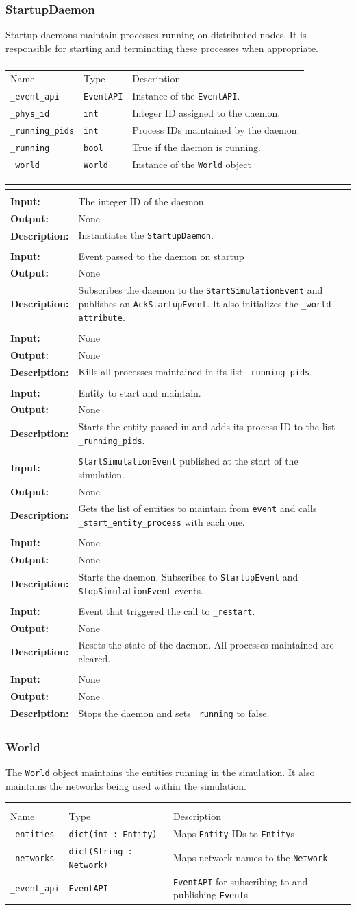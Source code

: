 \documentclass[titlepage]{article}
\newcommand{\operations}[1]{
\begin{center}
    \begin{longtable}{|p{4cm}|p{10cm + 2.0\tabcolsep}|}
    \hline
    \multicolumn{2}{|l|}{\cellcolor[gray]{0.5}{\textbf{Operations}}} \\ \hline
#1
    \end{longtable}
\end{center}
}
\newcommand{\operation}[4]{
    \hline
    \multicolumn{2}{|l|}{\cellcolor[gray]{0.8}{\texttt{#1}}} \\ \hline
    \hspace{7pt}\textbf{Input:} & #2 \\ \hline
    \hspace{7pt}\textbf{Output:} & #3 \\ \hline
    \hspace{7pt}\textbf{Description:} & #4 \\ \hline
}
\newcommand{\attributes}[1]{
    \begin{center}
        \begin{tabular}{|p{3.5cm}|p{3.5cm}|p{7cm}|}
            \multicolumn{3}{|l|}{\cellcolor[gray]{0.5}{\textbf{Attributes}}} \\ \hline
            \rowcolor[gray]{0.8} Name & Type & Description \\ \hline 
            #1
        \end{tabular}
    \end{center}
}
\newcommand{\attribute}[3]{
    \texttt{#1} & \texttt{#2} & #3 \\ \hline
}
\begin{document}
\subsubsection{StartupDaemon}
{Startup daemons maintain processes running on distributed nodes. It is responsible for starting and terminating these processes when appropriate.}

\attributes{
    \attribute{\_event\_api}{EventAPI}{Instance of the \texttt{EventAPI}.}
    \attribute{\_phys\_id}{int}{Integer ID assigned to the daemon.}
    \attribute{\_running\_pids}{int}{Process IDs maintained by the daemon.}
    \attribute{\_running}{bool}{True if the daemon is running.}
    \attribute{\_world}{World}{Instance of the \texttt{World} object}
}

\operations{
    \operation{\_\_init\_\_(phys\_id)}{The integer ID of the daemon.}{None}{Instantiates the \texttt{StartupDaemon}.}
    \operation{\_on\_startup(event)}{Event passed to the daemon on startup}{None}{Subscribes the daemon to the \texttt{StartSimulationEvent} and publishes an \texttt{AckStartupEvent}. It also initializes the \texttt{\_world attribute}.}
    \operation{terminate\_all()}{None}{None}{Kills all processes maintained in its list \texttt{\_running\_pids}.}
    \operation{\_start\_entity\_processes(entity)}{Entity to start and maintain.}{None}{Starts the entity passed in and adds its process ID to the list \texttt{\_running\_pids}.}
    \operation{\_on\_sim\_start(event)}{\texttt{StartSimulationEvent} published at the start of the simulation.}{None}{Gets the list of entities to maintain from \texttt{event} and calls \texttt{\_start\_entity\_process} with each one.}
    \operation{start()}{None}{None}{Starts the daemon. Subscribes to \texttt{StartupEvent} and \texttt{StopSimulationEvent} events.}
    \operation{\_restart(event)}{Event that triggered the call to \texttt{\_restart}.}{None}{Resets the state of the daemon. All processes maintained are cleared.}
    \operation{stop()}{None}{None}{Stops the daemon and sets \texttt{\_running} to false.}
}

\subsubsection{World}
{The \texttt{World} object maintains the entities running in the simulation. It also maintains the networks being used within the simulation.}

\attributes{
    \attribute{\_entities}{dict(int : Entity)}{Maps \texttt{Entity} IDs to \texttt{Entity}s}
    \attribute{\_networks}{dict(String : Network)}{Maps network names to the \texttt{Network}}
    \attribute{\_event\_api}{EventAPI}{\texttt{EventAPI} for subscribing to and publishing \texttt{Event}s}
}
\end{document}
